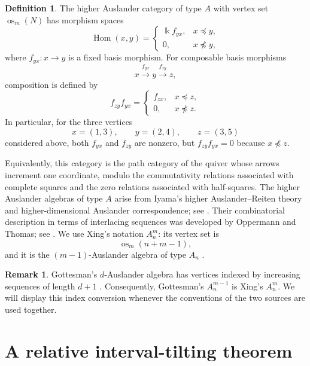 \documentclass[12pt,a4paper,english,reqno]{amsart}
\theoremstyle{plain}
\theoremstyle{definition}
\newtheorem{definition}[theorem]{Definition}
\newtheorem{remark}[theorem]{Remark}
\newcommand{\kk}{\Bbbk}
\newcommand{\Hom}{\operatorname{Hom}}
\newcommand{\os}{\operatorname{os}}
\begin{document}
\begin{definition}
The higher Auslander category of type $A$ with vertex set $\os_m(N)$
has morphism spaces
\begin{equation}
\Hom(x,y)
=
\begin{cases}
\kk f_{yx}, & x\preceq y,\\
0,              & x\npreceq y,
\end{cases}
\label{eq:higher-hom}
\end{equation}
where $f_{yx}\colon x\to y$ is a fixed basis morphism. For composable
basis morphisms
\[
x\xrightarrow{f_{yx}}y\xrightarrow{f_{zy}}z,
\]
composition is defined by
\begin{equation}
f_{zy}f_{yx}
=
\begin{cases}
f_{zx}, & x\preceq z,\\
0,      & x\npreceq z.
\end{cases}
\label{eq:higher-composition}
\end{equation}
In particular, for the three vertices
\[
x=(1,3),\qquad y=(2,4),\qquad z=(3,5)
\]
considered above, both $f_{yx}$ and $f_{zy}$ are nonzero, but $f_{zy}f_{yx}=0$
because $x\npreceq z$.
\end{definition}
Equivalently, this category is the path category of the quiver whose
arrows increment one coordinate, modulo the commutativity relations
associated with complete squares and the zero relations associated with
half-squares.
The higher Auslander algebras of type $A$ arise from Iyama's higher
Auslander--Reiten theory and higher-dimensional Auslander correspondence;
see \cite{Iyama2007,Iyama2011}. Their combinatorial description in terms of
interlacing sequences was developed by Oppermann and Thomas; see
\cite{OppermannThomas,JassoKulshammer}. We use Xing's notation
$A_n^m$: its vertex set is
\[
\os_m(n+m-1),
\]
and it is the $(m-1)$-Auslander algebra of type $A_n$
\cite[Section~4.1]{Xing}.

\begin{remark}
\label{rem:index-conversion}
Gottesman's $d$-Auslander algebra has vertices indexed by increasing
sequences of length $d+1$ \cite{Gottesman}. Consequently,
Gottesman's $A_n^{m-1}$ is Xing's $A_n^m$. We will display this index
conversion whenever the conventions of the two sources are used
together.
\end{remark}

\section{A relative interval-tilting theorem}
\label{sec:relative}
\end{document}
